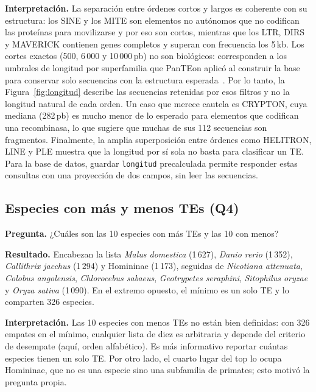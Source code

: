 \textbf{Interpretación.} La separación entre órdenes cortos y largos es
coherente con su estructura: los SINE y los MITE son elementos no
autónomos que no codifican las proteínas para movilizarse y por eso son
cortos, mientras que los LTR, DIRS y MAVERICK contienen genes completos y
superan con frecuencia los 5\,kb. Los cortes exactos (500, 6\,000 y
10\,000\,pb) no son biológicos: corresponden a los umbrales de longitud
por superfamilia que PanTEon aplicó al construir la base para conservar
solo secuencias con la estructura esperada~\cite{orozcoarias2026panteon}.
Por lo tanto, la Figura~\ref{fig:longitud} describe las secuencias
retenidas por esos filtros y no la longitud natural de cada orden. Un
caso que merece cautela es CRYPTON, cuya mediana (282\,pb) es mucho menor
de lo esperado para elementos que codifican una recombinasa, lo que
sugiere que muchas de sus 112 secuencias son fragmentos. Finalmente, la
amplia superposición entre órdenes como HELITRON, LINE y PLE muestra que
la longitud por sí sola no basta para clasificar un TE. Para la base de
datos, guardar \texttt{longitud} precalculada permite responder estas
consultas con una proyección de dos campos, sin leer las secuencias.

\subsection*{Especies con más y menos TEs (Q4)}

\textbf{Pregunta.} ¿Cuáles son las 10 especies con más TEs y las 10 con menos?

\textbf{Resultado.} Encabezan la lista \textit{Malus domestica} (1\,627),
\textit{Danio rerio} (1\,352), \textit{Callithrix jacchus} (1\,294) y
Homininae (1\,173), seguidas de \textit{Nicotiana attenuata},
\textit{Colobus angolensis}, \textit{Chlorocebus sabaeus},
\textit{Geotrypetes seraphini}, \textit{Sitophilus oryzae} y
\textit{Oryza sativa} (1\,090). En el extremo opuesto, el mínimo es un
solo TE y lo comparten 326 especies.

\textbf{Interpretación.} Las 10 especies con menos TEs no están bien
definidas: con 326 empates en el mínimo, cualquier lista de diez es
arbitraria y depende del criterio de desempate (aquí, orden alfabético).
Es más informativo reportar cuántas especies tienen un solo TE. Por otro
lado, el cuarto lugar del top lo ocupa Homininae, que no es una especie
sino una subfamilia de primates; esto motivó la pregunta propia.

